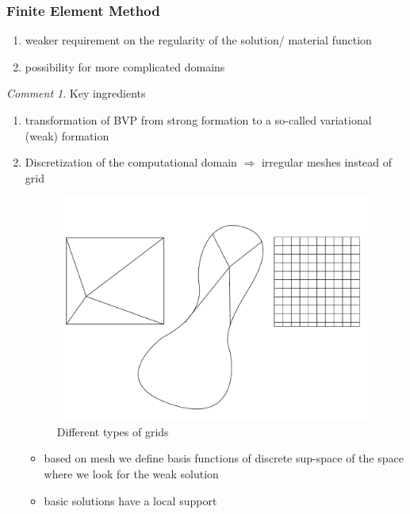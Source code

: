 \documentclass[english]{article}
\theoremstyle{definition}
\theoremstyle{remark}
\newtheorem*{comm}{Comment}
\newcommand{\drw}{\Rightarrow}			%
\begin{document}
\subsubsection{Finite Element Method}
\begin{enumerate}
\item weaker requirement on the regularity of the solution/ material function
\item possibility for more complicated domains
\end{enumerate}
\begin{comm}
  Key ingredients
  \begin{enumerate}
  \item transformation of BVP from strong formation to a so-called variational (weak) formation
  \item Discretization of the computational domain $\drw$ irregular meshes instead of grid

\begin{figure}[tbh]
  \begin{center}
    \includegraphics[width=\textwidth]{figs/differentGrids.pdf}
  \end{center}
  \caption{Different types of grids}
  \label{different-grids-figure}
\end{figure}

    \begin{itemize}
    \item based on mesh we define basis functions of discrete sup-space of the space where we look for the weak solution
    \item basic solutions have a local support
    \end{itemize}
  \end{enumerate}
\end{comm}
\end{document}
